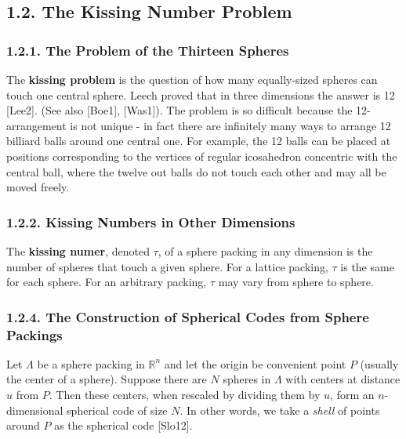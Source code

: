 \documentclass{article}
\newcommand{\R}{\mathbb{R}}
\renewcommand{\=}{\equiv}
\begin{document}

\subsection*{1.2. The Kissing Number Problem}

\subsubsection*{1.2.1. The Problem of the Thirteen Spheres}

The \textbf{kissing problem} is the question of how many equally-sized spheres can touch one central sphere.
Leech proved that in three dimensions the answer is 12 [Lee2]. (See also [Boe1], [Was1]).
The problem is so difficult because the 12-arrangement is not unique - in fact there are infinitely many ways to arrange 12 billiard balls around one central one.
For example, the 12 balls can be placed at positions corresponding to the vertices of regular icosahedron concentric with the central ball, where the twelve out balls do not touch each other and may all be moved freely.

\subsubsection*{1.2.2. Kissing Numbers in Other Dimensions}

The \textbf{kissing numer}, denoted $\tau$, of a sphere packing in any dimension is the number of spheres that touch a given sphere.
For a lattice packing, $\tau$ is the same for each sphere.
For an arbitrary packing, $\tau$ may vary from sphere to sphere.


\subsubsection*{1.2.4. The Construction of Spherical Codes from Sphere Packings}

Let $\Lambda$ be a sphere packing in $\R^n$
and let the origin be convenient point $P$ (usually the center of a sphere).
Suppose there are $N$ spheres in $\Lambda$ with centers at distance $u$ from $P$.
Then these centers, when rescaled by dividing them by $u$, form an $n$-dimensional spherical code of size $N$.
In other words, we take a \textit{shell} of points around $P$ as the spherical code [Slo12].
\end{document}
